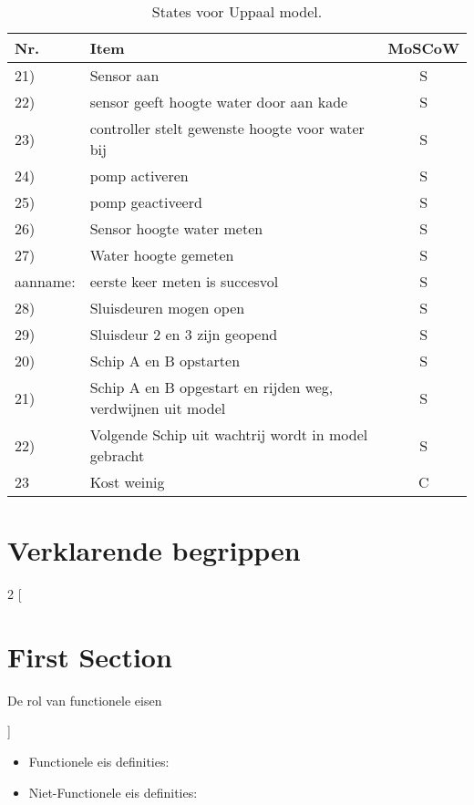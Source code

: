 \documentclass[a4paper,12pt]{article}
\begin{document}
\begin{table}[h] %
\caption{States voor Uppaal model.} %
\label{reqs} %
\begin{center} %
\begin{tabular}{llc} %
\hline %
\textbf{Nr.} & \textbf{Item} & \textbf{MoSCoW}\\ %
\hline
21) & Sensor aan & S\\
22) & sensor geeft hoogte water door aan kade & S\\
23) & controller stelt gewenste hoogte voor water bij & S\\
24) & pomp activeren & S\\
25) & pomp geactiveerd & S\\
26) & Sensor hoogte water meten & S\\
27) & Water hoogte gemeten & S\\
aanname: & eerste keer meten is succesvol & S\\
28) &  Sluisdeuren mogen open & S\\
29) &  Sluisdeur 2 en 3 zijn geopend & S\\
20) &  Schip A en B opstarten & S\\
21) & Schip A en B opgestart en rijden weg, verdwijnen uit model & S\\
22) & Volgende Schip uit wachtrij wordt in model gebracht & S\\
23  & Kost weinig & C\\

\hline
\end{tabular}
\end{center}
\end{table}

\section{Verklarende begrippen}

\begin{multicols}{2}
[
\section{First Section}
De rol van functionele eisen

]

\begin{itemize}
  \item Functionele eis definities:
  \item Niet-Functionele eis definities:
\end{itemize}


\end{multicols}
 
\end{document}
